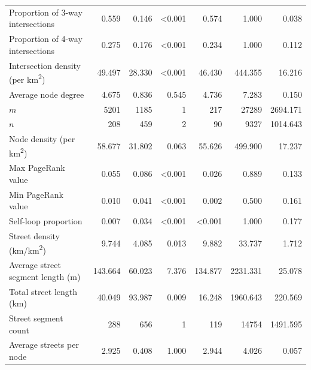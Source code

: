\documentclass[Afour,sageh,times]{sagej}
\begin{document}
\begin{table}
\begin{tabular}{ l r r r r r r }
	Proportion of 3-way intersections                & 0.559   & 0.146   & \textless0.001 & 0.574          & 1.000    & 0.038   \\
	Proportion of 4-way intersections                & 0.275   & 0.176   & \textless0.001 & 0.234          & 1.000    & 0.112   \\
	Intersection density (per km\textsuperscript{2}) & 49.497  & 28.330  & \textless0.001 & 46.430         & 444.355  & 16.216  \\
	Average node degree                              & 4.675   & 0.836   & 0.545          & 4.736          & 7.283    & 0.150   \\
	$m$                                              & 5201    & 1185    & 1              & 217            & 27289    & 2694.171\\
	$n$                                              & 208     & 459     & 2              & 90             & 9327     & 1014.643\\
	Node density (per km\textsuperscript{2})         & 58.677  & 31.802  & 0.063          & 55.626         & 499.900  & 17.237  \\
	Max PageRank value                               & 0.055   & 0.086   & \textless0.001 & 0.026          & 0.889    & 0.133   \\
	Min PageRank value                               & 0.010   & 0.041   & \textless0.001 & 0.002          & 0.500    & 0.161   \\
	Self-loop proportion                             & 0.007   & 0.034   & \textless0.001 & \textless0.001 & 1.000    & 0.177   \\
	Street density (km/km\textsuperscript{2})        & 9.744   & 4.085   & 0.013          & 9.882          & 33.737   & 1.712   \\
	Average street segment length (m)                & 143.664 & 60.023  & 7.376          & 134.877        & 2231.331 & 25.078  \\
	Total street length (km)                         & 40.049  & 93.987  & 0.009          & 16.248         & 1960.643 & 220.569 \\
	Street segment count                             & 288     & 656     & 1              & 119            & 14754    & 1491.595\\
	Average streets per node                         & 2.925   & 0.408   & 1.000          & 2.944          & 4.026    & 0.057   \\
	\bottomrule
\end{tabular}
\end{table}
\end{document}
